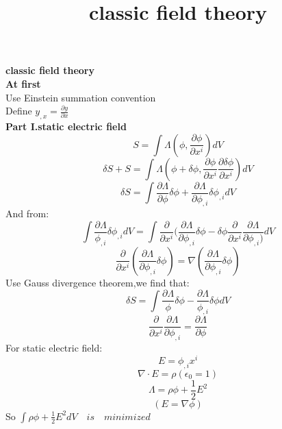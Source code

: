 \documentclass{article}
\title{classic field theory}
\begin{document}
\begin{CJK}{UTF8}{gbsn}
\textbf{classic field theory}\\
\textbf{At first}\\
Use Einstein summation convention \\
Define $ y_{,x}=\frac{\partial y}{\partial x} $\\
\textbf{Part I.static electric field}\\
$$ S=\int \Lambda(\phi,\frac{\partial \phi}{\partial x^i}) dV $$
$$ \delta S + S= \int \Lambda(\phi+\delta \phi,\frac{\partial \phi}{\partial x^i}\frac{\partial \delta \phi}{\partial x^i}) dV $$
$$ \delta S = \int \frac{\partial \Lambda}{\partial \phi}\delta \phi+\frac {\partial \Lambda}{\partial \phi_{,i}}\delta \phi_{,i}dV $$
And from:\\
$$ \int \frac{\partial \Lambda}{\phi_{,i}} \delta \phi_{,i}dV=\int \frac{\partial}{\partial x^i}(\frac{\partial\Lambda}{\partial \phi_{,i}}\delta \phi - \delta \phi \frac{\partial}{\partial x^i}\frac{\partial \Lambda}{\partial \phi_{,i})}dV $$
$$ \frac{\partial}{\partial x^i}(\frac{\partial \Lambda}{\partial \phi_{,i}}\delta \phi)=\nabla(\frac{\partial \Lambda}{\partial \phi_{,i}}\delta \phi) $$
Use Gauss divergence theorem,we find that: \\
$$ \delta S =\int \frac{\partial \Lambda}{\phi}\delta \phi-\frac{\partial \Lambda}{\phi_{,i}}\delta \phi dV $$
$$ \frac{\partial}{\partial x^i}\frac{\partial \Lambda}{\partial \phi_{,i}}=\frac{\partial \Lambda}{\partial \phi}$$
For static electric field:\\
$$ E=\phi_{,i}x^i $$
$$ \nabla \cdot E=\rho (\epsilon_0=1)$$
$$ \Lambda=\rho \phi + \frac{1}{2} E^2 $$
$$ (E=\nabla \phi) $$
So $\int \rho \phi + \frac{1}{2}E^2 dV \quad is \quad minimized$\\
\end{CJK}
\end{document}
